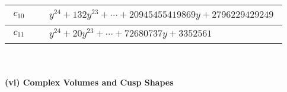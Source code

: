 \documentclass[1p]{elsarticle_modified}
\theoremstyle{definition}
\begin{document}
\begin{tabular}{m{50pt}|m{274pt}}
\hline $$\begin{aligned}c_{10}\end{aligned}$$&$\begin{aligned}
&y^{24}+132 y^{23}+\cdots+20945455419869 y+2796229429249
\end{aligned}$\\
\hline $$\begin{aligned}c_{11}\end{aligned}$$&$\begin{aligned}
&y^{24}+20 y^{23}+\cdots+72680737 y+3352561
\end{aligned}$\\
\hline
\end{tabular}\\~\\
\newpage\flushleft \textbf{(vi) Complex Volumes and Cusp Shapes}
\end{document}
